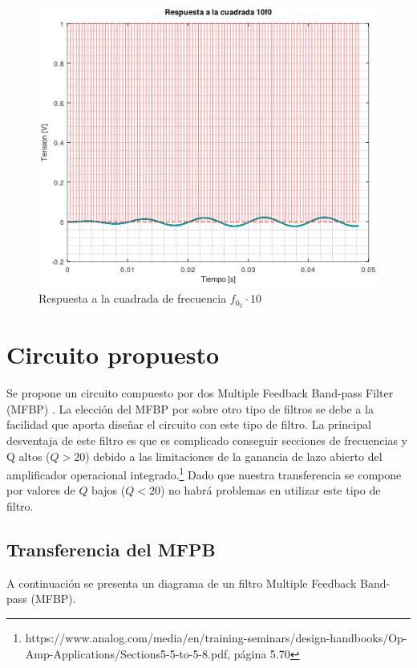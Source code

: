 \documentclass[11pt,a4paper]{report}
\begin{document}
\clearpage
\begin{figure}[h!]
\includegraphics[scale=1]{RtaCuadradaWo23.png}
\caption{Respuesta a la cuadrada de frecuencia $f_{0_{2}} \cdot 10$}
\end{figure}

\section*{Circuito propuesto}

Se propone un circuito compuesto por dos Multiple Feedback Band-pass Filter (MFBP) . La elección del MFBP por sobre otro tipo de filtros se debe a la 
facilidad que aporta diseñar el circuito con este tipo de filtro. La principal
desventaja de este filtro es que es complicado conseguir secciones de frecuencias y Q altos ($Q > 20$) debido a las limitaciones de la ganancia de lazo abierto del amplificador operacional integrado.\footnote{https://www.analog.com/media/en/training-seminars/design-handbooks/Op-Amp-Applications/Sections5-5-to-5-8.pdf, página 5.70} Dado que nuestra transferencia se compone por valores de $Q$ bajos ($Q < 20$) no habrá problemas en utilizar este tipo de filtro.

\subsection*{Transferencia del MFPB}

A continuación se presenta un diagrama de un filtro Multiple Feedback Band-pass (MFBP).
\end{document}
